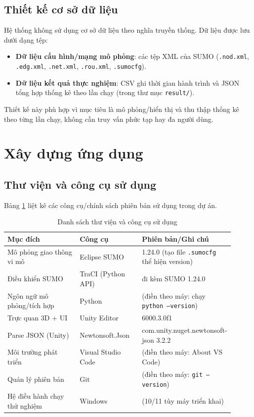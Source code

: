 \documentclass[../DoAn.tex]{subfiles}
\begin{document}
\subsection{Thiết kế cơ sở dữ liệu}
Hệ thống không sử dụng cơ sở dữ liệu theo nghĩa truyền thống. Dữ liệu được lưu dưới dạng tệp:
\begin{itemize}
	\item \textbf{Dữ liệu cấu hình/mạng mô phỏng}: các tệp XML của SUMO (\texttt{.nod.xml}, \texttt{.edg.xml}, \texttt{.net.xml}, \texttt{.rou.xml}, \texttt{.sumocfg}).
	\item \textbf{Dữ liệu kết quả thực nghiệm}: CSV ghi thời gian hành trình và JSON tổng hợp thống kê theo lần chạy (trong thư mục \texttt{result/}).
\end{itemize}
Thiết kế này phù hợp vì mục tiêu là mô phỏng/hiển thị và thu thập thống kê theo từng lần chạy, không cần truy vấn phức tạp hay đa người dùng.

\section{Xây dựng ứng dụng}
\subsection{Thư viện và công cụ sử dụng}
Bảng \ref{table:tools} liệt kê các công cụ/chính sách phiên bản sử dụng trong dự án.

\begin{table}[htbp]
\centering
\begin{tabular}{p{0.35\linewidth}p{0.28\linewidth}p{0.28\linewidth}}
\hline
\textbf{Mục đích} & \textbf{Công cụ} & \textbf{Phiên bản/Ghi chú} \\ \hline
Mô phỏng giao thông vi mô & Eclipse SUMO & 1.24.0 (tạo file \texttt{.sumocfg} thể hiện version) \\ \hline
Điều khiển SUMO & TraCI (Python API) & đi kèm SUMO 1.24.0 \\ \hline
Ngôn ngữ mô phỏng/tích hợp & Python & (điền theo máy: chạy \texttt{python --version}) \\ \hline
Trực quan 3D + UI & Unity Editor & 6000.3.0f1 \\ \hline
Parse JSON (Unity) & Newtonsoft.Json & com.unity.nuget.newtonsoft-json 3.2.2 \\ \hline
Môi trường phát triển & Visual Studio Code & (điền theo máy: About VS Code) \\ \hline
Quản lý phiên bản & Git & (điền theo máy: \texttt{git --version}) \\ \hline
Hệ điều hành chạy thử nghiệm & Windows & (10/11 tùy máy triển khai) \\ \hline
\end{tabular}
\caption{Danh sách thư viện và công cụ sử dụng}
\label{table:tools}
\end{table}
\end{document}
